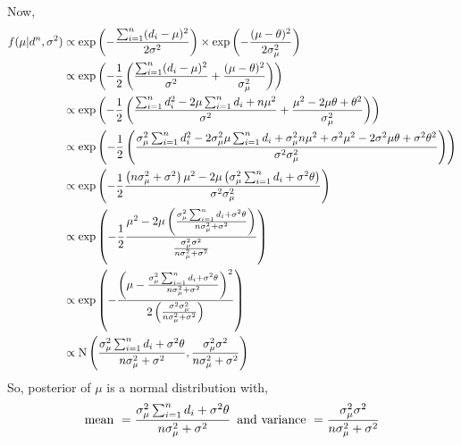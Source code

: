 \begin{example}
    Now, 
    \begin{align*}
        f(\mu|d^{n},\sigma^{2} ) &\propto \exp \left( - \frac{ \sum_{i = 1}^{n}(d_i - \mu)^2  }{ 2 \sigma^{2} } \right) \times \exp \left( - \frac{ (\mu-\theta)^{2} }{ 2 \sigma_{\mu} ^{2} } \right) \\ 
                                 &\propto \exp \left( - \frac{ 1 }{ 2 } \left( \frac{ \sum_{i = 1}^{n}(d_i - \mu)^2  }{ \sigma^{2} } + \frac{ (\mu-\theta)^{2} }{ \sigma_{\mu} ^{2} } \right) \right) \\ 
                                 &\propto \exp \left( - \frac{ 1 }{ 2 } \left( \frac{ \sum_{i=1}^{n} d_i^{2} - 2 \mu \sum_{i=1}^{n} d_i + n \mu^{2} }{ \sigma^{2} } + \frac{ \mu^{2} - 2 \mu \theta + \theta^{2} }{ \sigma_\mu^{2} }  \right) \right) \\ 
                                 &\propto \exp \left( - \frac{ 1 }{ 2 } \left( \frac{ \sigma_\mu^{2} \sum_{i=1}^{n} d_i^{2} - 2 \sigma_\mu^{2} \mu \sum_{i=1}^{n} d_i + \sigma_\mu^{2} n \mu^{2} + \sigma^{2}\mu^{2} - 2 \sigma^{2}\mu \theta + \sigma^{2}\theta^{2} }{ \sigma^{2}\sigma_\mu^{2} } \right) \right) \\
                                 &\propto \exp \left( - \frac{ 1 }{ 2 }  \frac{ \left( n \sigma_{\mu}^{2} + \sigma^{2}  \right)\mu^{2} - 2 \mu \left( \sigma_{\mu}^{2}\sum_{i=1}^{n}d_i + \sigma^{2}\theta  \right)   }{ \sigma^{2}\sigma_{\mu} ^{2} } \right) \\
                                 &\propto \exp \left( - \frac{ 1 }{ 2 } \frac{ \mu^{2} - 2 \mu \left( \frac{ \sigma_{\mu}^{2}\sum_{i=1}^{n} d_i + \sigma^{2}\theta  }{ n \sigma_{\mu}^{2} + \sigma^{2}  } \right) }{ \frac{ \sigma_{\mu}^{2}\sigma^{2} }{  n \sigma_{\mu}^{2} + \sigma^{2} } }  \right) \\
                                 &\propto \exp \left( - \frac{ \left( \mu - \frac{ \sigma_{\mu}^{2}\sum_{i=1}^{n} d_i + \sigma^{2}\theta }{ n \sigma_{\mu}^{2}+\sigma^{2}  } \right)^{2} }{ 2 \left( \frac{ \sigma^{2}\sigma_{\mu}^{2}  }{  n \sigma_{\mu}^{2}+\sigma^{2} } \right) } \right) \\ 
                                 &\propto \text{N}\left( \frac{ \sigma_{\mu}^{2}\sum_{i=1}^{n} d_i + \sigma^{2}\theta  }{ n \sigma_{\mu}^{2} + \sigma^{2} }, \frac{ \sigma_{\mu}^{2}\sigma^{2}  }{ n \sigma_{\mu}^{2} + \sigma^{2} } \right)
    \end{align*}
    So, posterior of $ \mu $ is a normal distribution with,
    \begin{align*}
        \text{mean }= \frac{ \sigma_{\mu}^{2}\sum_{i=1}^{n} d_i + \sigma^{2}\theta  }{ n \sigma_{\mu}^{2} + \sigma^{2} }\, \text{ and  variance }= \frac{ \sigma_{\mu}^{2}\sigma^{2}  }{ n \sigma_{\mu}^{2} + \sigma^{2} }
    \end{align*}


\end{example}
